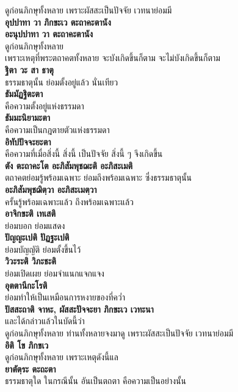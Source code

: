 \documentclass[12pt]{article}
\begin{document}
\indent ดูก่อนภิกษุทั้งหลาย เพราะผัสสะเป็นปัจจัย เวทนาย่อมมี\\
\textbf{อุปปาทา วา ภิกขะเว ตะถาคะตานัง\\
อะนุปปาทา วา ตะถาคะตานัง}\\
\indent ดูก่อนภิกษุทั้งหลาย\\
\indent เพราะเหตุที่พระตถาคตทั้งหลาย จะบังเกิดขึ้นก็ตาม จะไม่บังเกิดขึ้นก็ตาม\\
\textbf{ฐิตา วะ สา ธาตุ}\\
\indent ธรรมธาตุนั้น ย่อมตั้งอยู่แล้ว นั่นเทียว\\
\textbf{ธัมมัฏฐิตะตา}\\
\indent คือความตั้งอยู่แห่งธรรมดา\\
\textbf{ธัมมะนิยามะตา}\\
\indent คือความเป็นกฎตายตัวแห่งธรรมดา\\
\textbf{อิทัปปัจจะยะตา}\\
\indent คือความที่เมื่อสิ่งนี้ สิ่งนี้ เป็นปัจจัย สิ่งนี้ ๆ จึงเกิดขึ้น\\
\textbf{ตัง ตะถาคะโต อะภิสัมพุชฌะติ อะภิสะเมติ}\\
\indent ตถาคตย่อมรู้พร้อมเฉพาะ ย่อมถึงพร้อมเฉพาะ ซึ่งธรรมธาตุนั้น\\
\textbf{อะภิสัมพุชฌิตฺวา อะภิสะเมตฺวา}\\
\indent ครั้นรู้พร้อมเฉพาะแล้ว ถึงพร้อมเฉพาะแล้ว\\
\textbf{อาจิกขะติ เทเสติ}\\
\indent ย่อมบอก ย่อมแสดง\\
\textbf{ปัญญะเปติ ปัฏฐะเปติ}\\
\indent ย่อมบัญญัติ ย่อมตั้งขึ้นไว้\\
\textbf{วิวะระติ วิภะชะติ}\\
\indent ย่อมเปิดเผย ย่อมจำแนกแจกแจง\\
\textbf{อุตตานีกะโรติ}\\
\indent ย่อมทำให้เป็นเหมือนการหงายของที่คว่ำ\\
\textbf{ปัสสะถาติ จาหะ, ผัสสะปัจจะยา ภิกขะเว เวทะนา}\\
\indent และได้กล่าวแล้วในบัดนี้ว่า \\
\indent ดูก่อนภิกษุทั้งหลาย ท่านทั้งหลายจงมาดู เพราะผัสสะเป็นปัจจัย เวทนาย่อมมี\\
\textbf{อิติ โข ภิกขเว}\\
\indent ดูก่อนภิกษุทั้งหลาย เพราะเหตุดังนี้แล\\
\textbf{ยาตัตฺระ ตะถะตา}\\
\indent ธรรมธาตุใด ในกรณีนั้น อันเป็นตถตา คือความเป็นอย่างนั้น\\
\end{document}
